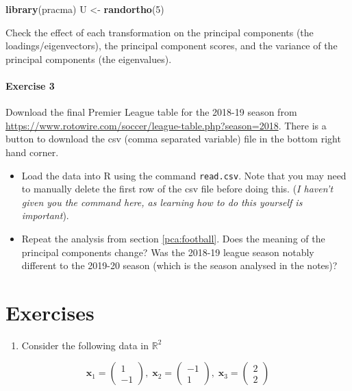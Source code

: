 \documentclass[]{book}
\newenvironment{Shaded}{\begin{snugshade}}{\end{snugshade}}
\newcommand{\DecValTok}[1]{\textcolor[rgb]{0.00,0.00,0.81}{#1}}
\newcommand{\KeywordTok}[1]{\textcolor[rgb]{0.13,0.29,0.53}{\textbf{#1}}}
\newcommand{\NormalTok}[1]{#1}
\newcommand{\StringTok}[1]{\textcolor[rgb]{0.31,0.60,0.02}{#1}}
\providecommand{\tightlist}{%
  \setlength{\itemsep}{0pt}\setlength{\parskip}{0pt}}
\let\oldparagraph\paragraph
\renewcommand{\paragraph}[1]{\oldparagraph{#1}\mbox{}}
\theoremstyle{definition}
\theoremstyle{definition}
\theoremstyle{definition}
\theoremstyle{remark}
\begin{document}
\begin{Shaded}
\begin{Highlighting}[]
\KeywordTok{library}\NormalTok{(pracma)}
\NormalTok{U <-}\StringTok{ }\KeywordTok{randortho}\NormalTok{(}\DecValTok{5}\NormalTok{)}
\end{Highlighting}
\end{Shaded}

Check the effect of each transformation on the principal components (the loadings/eigenvectors), the principal component scores, and the variance of the principal components (the eigenvalues).

\hypertarget{exercise-3}{%
\paragraph{Exercise 3}\label{exercise-3}}

Download the final Premier League table for the 2018-19 season from
\url{https://www.rotowire.com/soccer/league-table.php?season=2018}. There is a button to download the csv (comma separated variable) file in the bottom right hand corner.

\begin{itemize}
\item
  Load the data into R using the command \texttt{read.csv}. Note that you may need to manually delete the first row of the csv file before doing this. (\emph{I haven't given you the command here, as learning how to do this yourself is important}).
\item
  Repeat the analysis from section \ref{pca:football}. Does the meaning of the principal components change? Was the 2018-19 league season notably different to the 2019-20 season (which is the season analysed in the notes)?
\end{itemize}

\hypertarget{exercises-1}{%
\section{Exercises}\label{exercises-1}}

\begin{enumerate}
\def\labelenumi{\arabic{enumi}.}
\tightlist
\item
  Consider the following data in \(\mathbb{R}^2\)
\end{enumerate}

\[\mathbf x_1 =\begin{pmatrix}1\\-1\end{pmatrix},\; \mathbf x_2 =\begin{pmatrix}-1\\1\end{pmatrix},
\;\mathbf x_3 =\begin{pmatrix}2\\2\end{pmatrix}\]
\end{document}
